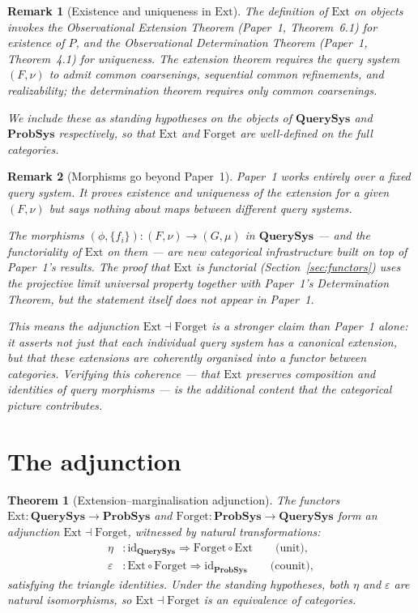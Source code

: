 \documentclass[11pt]{article}
\newtheorem{theorem}{Theorem}
\newtheorem{remark}{Remark}
\newcommand{\QSys}{\mathbf{QuerySys}}
\newcommand{\PSys}{\mathbf{ProbSys}}
\newcommand{\id}{\mathrm{id}}
\newcommand{\Ext}{\mathrm{Ext}}
\newcommand{\Forget}{\mathrm{Forget}}
\begin{document}
\begin{remark}[Existence and uniqueness in $\Ext$]
The definition of $\Ext$ on objects invokes the Observational Extension
Theorem (Paper~1, Theorem~6.1) for existence of $P$, and the Observational
Determination Theorem (Paper~1, Theorem~4.1) for uniqueness.  The extension
theorem requires the query system $(F, \nu)$ to admit common coarsenings,
sequential common refinements, and realizability; the determination theorem
requires only common coarsenings.

We include these as standing hypotheses on the objects of $\QSys$ and $\PSys$
respectively, so that $\Ext$ and $\Forget$ are well-defined on the full
categories.
\end{remark}

\begin{remark}[Morphisms go beyond Paper~1]
Paper~1 works entirely over a \emph{fixed} query system.  It proves existence
and uniqueness of the extension for a given $(F, \nu)$ but says nothing about
maps between different query systems.

The morphisms $(\phi, \{f_i\}) : (F, \nu) \to (G, \mu)$ in $\QSys$ ---
and the functoriality of $\Ext$ on them --- are new categorical
infrastructure built \emph{on top of} Paper~1's results.  The proof that
$\Ext$ is functorial (Section~\ref{sec:functors}) uses the projective limit
universal property together with Paper~1's Determination Theorem, but the
statement itself does not appear in Paper~1.

This means the adjunction $\Ext \dashv \Forget$ is a stronger claim than
Paper~1 alone: it asserts not just that each individual query system has a
canonical extension, but that these extensions are \emph{coherently
organised} into a functor between categories.  Verifying this coherence ---
that $\Ext$ preserves composition and identities of query morphisms --- is
the additional content that the categorical picture contributes.
\end{remark}

\section{The adjunction}
\label{sec:adjunction}

\begin{theorem}[Extension--marginalisation adjunction]\label{thm:adjunction}
The functors $\Ext : \QSys \to \PSys$ and $\Forget : \PSys \to \QSys$ form
an adjunction $\Ext \dashv \Forget$, witnessed by natural transformations:
\begin{align*}
  \eta &: \id_{\QSys} \Rightarrow \Forget \circ \Ext
    \qquad \text{(unit)}, \\
  \varepsilon &: \Ext \circ \Forget \Rightarrow \id_{\PSys}
    \qquad \text{(counit)},
\end{align*}
satisfying the triangle identities.  Under the standing hypotheses, both
$\eta$ and $\varepsilon$ are natural isomorphisms, so $\Ext \dashv \Forget$
is an \emph{equivalence of categories}.
\end{theorem}
\end{document}
